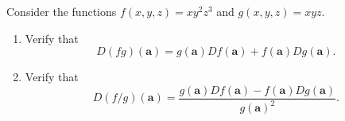\begin{problem}
Consider the functions $f(x,y,z) = xy^2z^3$ and $g(x,y,z) = xyz$.
\begin{enumerate}
\item Verify that \[D(fg)(\mathbf{a})=g(\mathbf{a})Df(\mathbf{a})+f(\mathbf{a})Dg(\mathbf{a}).\]
\item Verify that \[D(f/g)(\mathbf{a})=\frac{g(\mathbf{a})Df(\mathbf{a})-f(\mathbf{a})Dg(\mathbf{a})}{g(\mathbf{a})^2}.\]
\end{enumerate}
\end{problem}